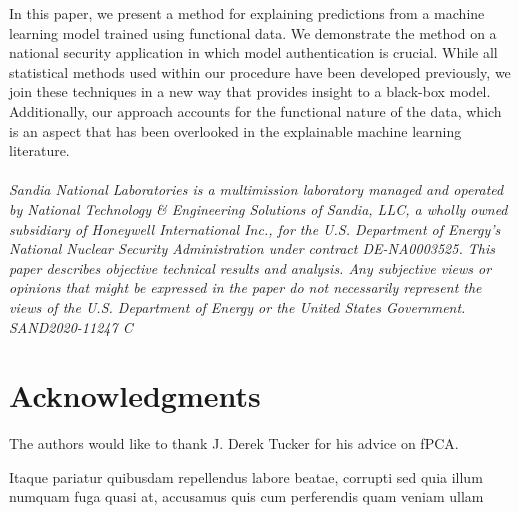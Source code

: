 \documentclass[letterpaper]{article}
\begin{document}
In this paper, we present a method for explaining predictions from a machine learning model trained using functional data. We demonstrate the method on a national security application in which model authentication is crucial. While all statistical methods used within our procedure have been developed previously, we join these techniques in a new way that provides insight to a black-box model. Additionally, our approach accounts for the functional nature of the data, which is an aspect that has been overlooked in the explainable machine learning literature.\\
\\
\textit{Sandia National Laboratories is a multimission laboratory managed and operated by National Technology \& Engineering Solutions of Sandia, LLC, a wholly owned subsidiary of Honeywell International Inc., for the U.S. Department of Energy's National Nuclear Security Administration under contract DE-NA0003525. This paper describes objective technical results and analysis. Any subjective views or opinions that might be expressed in the paper do not necessarily represent the views of the U.S. Department of Energy or the United States Government. SAND2020-11247 C}

\section*{Acknowledgments}

The authors would like to thank J. Derek Tucker for his advice on fPCA.


Itaque pariatur quibusdam repellendus labore beatae, corrupti sed quia illum numquam fuga quasi at, accusamus quis cum perferendis quam veniam ullam

\end{document}

